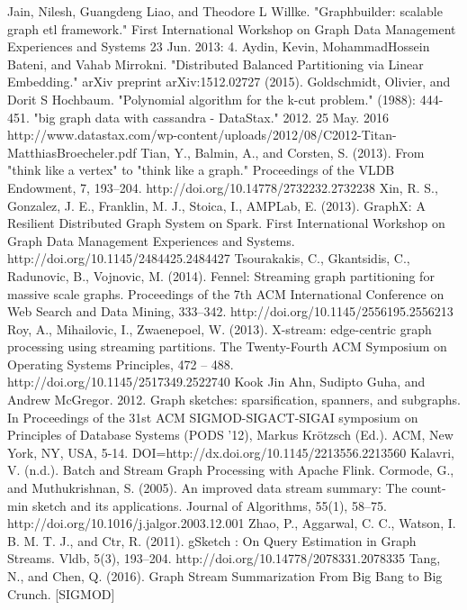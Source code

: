 \documentclass[12pt]{report}
\numberwithin{figure}{section}
\numberwithin{table}{section}
\begin{document}
\begin{thebibliography}{1}
   Jain, Nilesh, Guangdeng Liao, and Theodore L Willke. "Graphbuilder: scalable graph etl framework." First International Workshop on Graph Data Management Experiences and Systems 23 Jun. 2013: 4.
   Aydin, Kevin, MohammadHossein Bateni, and Vahab Mirrokni. "Distributed Balanced Partitioning via Linear Embedding." arXiv preprint arXiv:1512.02727 (2015).
   Goldschmidt, Olivier, and Dorit S Hochbaum. "Polynomial algorithm for the k-cut problem." (1988): 444-451.
   "big graph data with cassandra - DataStax." 2012. 25 May. 2016 http://www.datastax.com/wp-content/uploads/2012/08/C2012-Titan-MatthiasBroecheler.pdf
   Tian, Y., Balmin, A., and Corsten, S. (2013). From "think like a vertex" to "think like a graph." Proceedings of the VLDB Endowment, 7, 193–204. http://doi.org/10.14778/2732232.2732238
   Xin, R. S., Gonzalez, J. E., Franklin, M. J., Stoica, I.,  AMPLab, E. (2013). GraphX: A Resilient Distributed Graph System on Spark. First International Workshop on Graph Data Management Experiences and Systems. http://doi.org/10.1145/2484425.2484427
   Tsourakakis, C., Gkantsidis, C., Radunovic, B.,  Vojnovic, M. (2014). Fennel: Streaming graph partitioning for massive scale graphs. Proceedings of the 7th ACM International Conference on Web Search and Data Mining, 333–342. http://doi.org/10.1145/2556195.2556213
   Roy, A., Mihailovic, I.,  Zwaenepoel, W. (2013). X-stream: edge-centric graph processing using streaming partitions. The Twenty-Fourth ACM Symposium on Operating Systems Principles, 472 – 488. http://doi.org/10.1145/2517349.2522740
  Kook Jin Ahn, Sudipto Guha, and Andrew McGregor. 2012. Graph sketches: sparsification, spanners, and subgraphs. In Proceedings of the 31st ACM SIGMOD-SIGACT-SIGAI symposium on Principles of Database Systems (PODS '12), Markus Krötzsch (Ed.). ACM, New York, NY, USA, 5-14. DOI=http://dx.doi.org/10.1145/2213556.2213560
   Kalavri, V. (n.d.). Batch and Stream Graph Processing with Apache Flink.
   Cormode, G., and Muthukrishnan, S. (2005). An improved data stream summary: The count-min sketch and its applications. Journal of Algorithms, 55(1), 58–75. http://doi.org/10.1016/j.jalgor.2003.12.001
   Zhao, P., Aggarwal, C. C., Watson, I. B. M. T. J., and Ctr, R. (2011). gSketch : On Query Estimation in Graph Streams. Vldb, 5(3), 193–204. http://doi.org/10.14778/2078331.2078335
   Tang, N., and Chen, Q. (2016). Graph Stream Summarization From Big Bang to Big Crunch. [SIGMOD]

\end{thebibliography}
\end{document}
